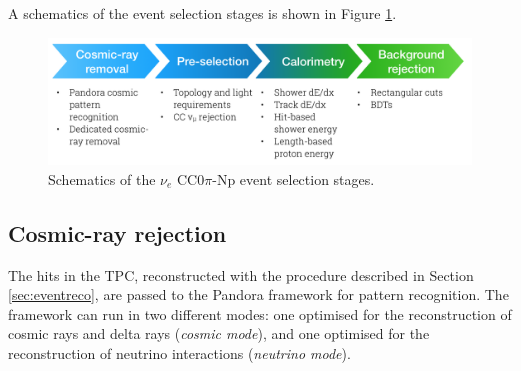 A schematics of the event selection stages is shown in Figure \ref{fig:selection}.

\begin{figure}[htbp]
\centering
  \includegraphics[width=0.9\linewidth]{figures/selection.png}
  \caption{Schematics of the $\nu_e$ CC0$\pi$-Np event selection stages.}
  \label{fig:selection}
\end{figure}

\subsection{Cosmic-ray rejection}\label{sec:cosmicremoval}
The hits in the TPC, reconstructed with the procedure described in Section \ref{sec:eventreco}, are passed to the Pandora framework for pattern recognition. The framework can run in two different modes: one optimised for the reconstruction of cosmic rays and delta rays (\emph{cosmic mode}), and one optimised for the reconstruction of neutrino interactions (\emph{neutrino mode}).

